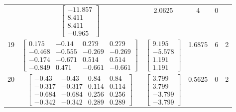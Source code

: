 \documentclass[a4paper,12pt]{article}
\begin{document}
\begin{tabular}{c c c c c c}
&
$\begin{bmatrix} -11.857 \\ 8.411 \\ 8.411 \\ -0.965 \end{bmatrix}$
&
2.0625
&
4
&
0
\\
19
&
$\begin{bmatrix} 0.175 & -0.14 & 0.279 & 0.279 \\ -0.468 & -0.555 & -0.269 & -0.269 \\ -0.174 & -0.671 & 0.514 & 0.514 \\ -0.849 & 0.471 & -0.661 & -0.661 \end{bmatrix}$
&
$\begin{bmatrix} 9.195 \\ -5.578 \\ 1.191 \\ 1.191 \end{bmatrix}$
&
1.6875
&
6
&
2
\\
20
&
$\begin{bmatrix} -0.43 & -0.43 & 0.84 & 0.84 \\ -0.317 & -0.317 & 0.114 & 0.114 \\ -0.684 & -0.684 & 0.256 & 0.256 \\ -0.342 & -0.342 & 0.289 & 0.289 \end{bmatrix}$
&
$\begin{bmatrix} 3.799 \\ 3.799 \\ -3.799 \\ -3.799 \end{bmatrix}$
&
0.5625
&
0
&
2
\\
\end{tabular} \egroup \newpage
\end{document}
